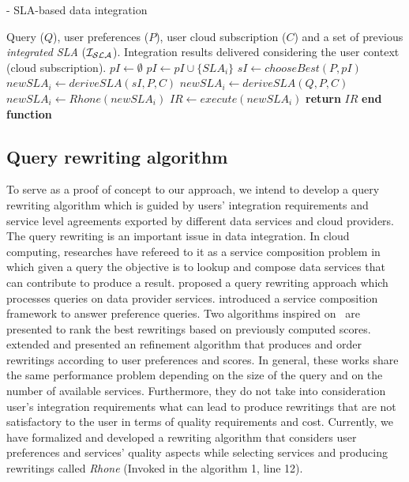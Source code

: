 \begin{algorithm} 
\caption{ - SLA-based data integration}
\label{qualityBasedAlgorithm}
\begin{algorithmic}[1]
\REQUIRE Query ($Q$), user preferences ($P$), user cloud subscription ($C$) and a set of previous \textit{integrated SLA} ($\bigSLA$).
\ENSURE Integration results delivered considering the user context (cloud subscription).
\STATE $pI \leftarrow \emptyset$
		\STATE $pI \leftarrow pI \cup \lbrace SLA_{i} \rbrace$		
	\ENDIF
\ENDFOR
{}
	\STATE $sI \leftarrow chooseBest(P, pI)$
	\STATE $newSLA_{i} \leftarrow deriveSLA(sI, P, C)$
\ELSE
	\STATE $newSLA_{i} \leftarrow deriveSLA(Q, P, C)$
	\STATE $newSLA_{i} \leftarrow Rhone(newSLA_{i})$
\ENDIF
\STATE $IR \leftarrow execute(newSLA_{i})$
\STATE \textbf{return} $IR$
\STATE \textbf{end function}
\end{algorithmic}
\end{algorithm} 

\subsection{Query rewriting algorithm}
To serve as a proof of concept to our approach, we intend to develop a query
rewriting algorithm which is guided by users' integration requirements and
service level agreements exported by different data services and cloud
providers. The query rewriting is an important issue in data integration. In
cloud computing, researches have refereed to it as a service composition problem
in which given a query the objective is to lookup and compose data services that
can contribute to produce a result. \cite{Barhamgi2010} proposed a query
rewriting approach which processes queries on data provider services.
\cite{Benouaret2011} introduced a service composition framework to answer
preference queries. Two algorithms inspired on~\cite{Barhamgi2010} are presented
to rank the best rewritings based on previously computed scores. \cite{ba2014}
extended \cite{Umberto} and presented an refinement algorithm that produces and
order rewritings according to user preferences and scores. In general, these
works share the same performance problem depending on the size of the query and
on the number of available services. Furthermore, they do not take into
consideration user's integration requirements what can lead to produce
rewritings that are not satisfactory to the user in terms of quality
requirements and cost. Currently, we have formalized and developed a rewriting
algorithm that considers user preferences and services' quality aspects while
selecting services and producing rewritings called \textit{Rhone} (Invoked in the algorithm 1, line 12).                    